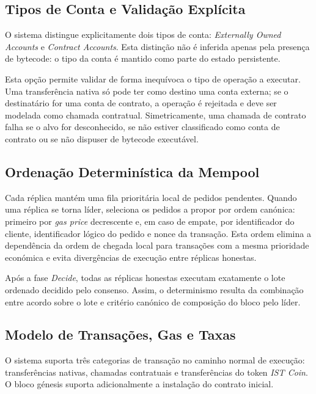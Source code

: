 \documentclass[runningheads]{llncs}
\begin{document}
\subsection{Tipos de Conta e Valida\c{c}\~ao Expl\'icita}
O sistema distingue explicitamente dois tipos de conta: \textit{Externally Owned Accounts} e \textit{Contract Accounts}. Esta distin\c{c}\~ao n\~ao \'e inferida apenas pela presen\c{c}a de bytecode: o tipo da conta \'e mantido como parte do estado persistente.

Esta op\c{c}\~ao permite validar de forma inequ\'ivoca o tipo de opera\c{c}\~ao a executar. Uma transfer\^encia nativa s\'o pode ter como destino uma conta externa; se o destinat\'ario for uma conta de contrato, a opera\c{c}\~ao \'e rejeitada e deve ser modelada como chamada contratual. Simetricamente, uma chamada de contrato falha se o alvo for desconhecido, se n\~ao estiver classificado como conta de contrato ou se n\~ao dispuser de bytecode execut\'avel.

\subsection{Ordena\c{c}\~ao Determin\'istica da Mempool}
Cada r\'eplica mant\'em uma fila priorit\'aria local de pedidos pendentes. Quando uma r\'eplica se torna l\'ider, seleciona os pedidos a propor por ordem can\'onica: primeiro por \textit{gas price} decrescente e, em caso de empate, por identificador do cliente, identificador l\'ogico do pedido e nonce da transa\c{c}\~ao. Esta ordem elimina a depend\^encia da ordem de chegada local para transa\c{c}\~oes com a mesma prioridade econ\'omica e evita diverg\^encias de execu\c{c}\~ao entre r\'eplicas honestas.

Ap\'os a fase \textit{Decide}, todas as r\'eplicas honestas executam exatamente o lote ordenado decidido pelo consenso. Assim, o determinismo resulta da combina\c{c}\~ao entre acordo sobre o lote e crit\'erio can\'onico de composi\c{c}\~ao do bloco pelo l\'ider.

\subsection{Modelo de Transa\c{c}\~oes, Gas e Taxas}
O sistema suporta tr\^es categorias de transa\c{c}\~ao no caminho normal de execu\c{c}\~ao: transfer\^encias nativas, chamadas contratuais e transfer\^encias do token \textit{IST Coin}. O bloco g\'enesis suporta adicionalmente a instala\c{c}\~ao do contrato inicial.
\end{document}
